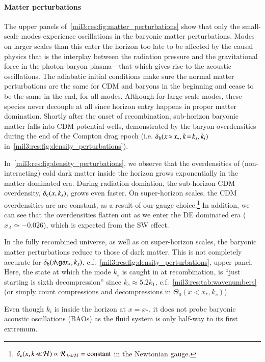 \paragraph{Matter perturbations}
The upper panels of~\cref{mil3:res:fig:matter_perturbations} show that only the small-scale modes experience oscillations in the baryonic matter perturbations. Modes on larger scales than this enter the horizon too late to be affected by the causal physics that is the interplay between the radiation pressure and the gravitational force in the photon-baryon plasma---that which gives rise to the acoustic oscillations. The adiabatic initial conditions make sure the normal matter perturbations are the same for CDM and baryons in the beginning and cease to be the same in the end, for all modes. Although for large-scale modes, these species never decouple at all since horizon entry happens in proper matter domination. Shortly after the onset of recombination, sub-horizon baryonic matter falls into CDM potential wells, demonstrated by the baryon overdensities during the end of the Compton drag epoch (i.e. $\delta_\mathrm{b}(x\!\approx\!x_*, k\!=\!k_s, k_i)$ in~\cref{mil3:res:fig:density_perturbations}). 

In~\cref{mil3:res:fig:density_perturbations}, we observe that the overdensities of (non-interacting) cold dark matter inside the horizon grows exponentially in the matter dominated era. During radiation domiation, the sub-horizon CDM overdensity, $\delta_\mathrm{c}(x, k_s)$, grows even faster. On super-horizon scales, the CDM overdensities are are constant, as a result of our gauge choice.\footnote{$\delta_\mathrm{c}(x, k\!\ll\! \mathcal{H}) \propto \mathcal{R}|_{k\ll \mathcal{H}} = \text{constant}$ in the Newtonian gauge.} In addition, we can see that the overdensities flatten out as we enter the DE dominated era ($x_\Lambda\simeq -0.026$), which is expected from the SW effect.

In the fully recombined universe, as well as on super-horizon scales, the baryonic matter perturbations reduce to those of dark matter. This is not completely accurate for $\delta\ped{b}(x\!\ga\!x_*,k_s)$, c.f.~\cref{mil3:res:fig:density_perturbations}, upper panel. Here, the state at which the mode $k_s$ is caught in at recombination, is ``just starting is sixth decompression'' since $k_s\approx 5.2 k_1$, c.f.~\cref{mil3:res:tab:wavenumbers} (or simply count compressions and decompressions in $\Theta_0(x\!<\!x_*, k_s)$). 

Even though $k_i$ is inside the horizon at $x=x_*$, it does not probe baryonic acoustic oscillations (BAOs) as the fluid system is only half-way to its first extremum. %

